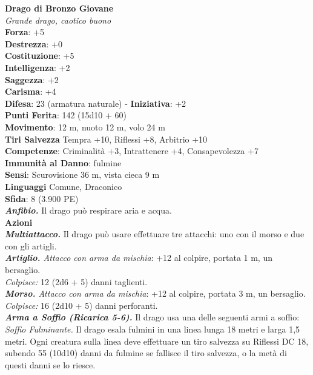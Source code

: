 \begin{multicols}{2}
\medskip\textbf{Drago di Bronzo Giovane}\\
\emph{Grande drago, caotico buono}\\
\textbf{Forza}: +5\\
\textbf{Destrezza}: +0\\
\textbf{Costituzione}: +5\\
\textbf{Intelligenza}: +2\\
\textbf{Saggezza}: +2\\
\textbf{Carisma}: +4\\
\textbf{Difesa}: 23 (armatura naturale) - \textbf{Iniziativa}: +2\\
\textbf{Punti Ferita}: 142 (15d10 + 60)\\
\textbf{Movimento}: 12 m, nuoto 12 m, volo 24 m\\
\textbf{Tiri Salvezza} Tempra +10, Riflessi +8, Arbitrio +10\\
\textbf{Competenze}: Criminalità +3, Intrattenere +4, Consapevolezza +7\\
\textbf{Immunità al Danno}: fulmine\\
\textbf{Sensi}: Scurovisione 36 m, vista cieca 9 m\\
\textbf{Linguaggi} Comune, Draconico\\
\textbf{Sfida}: 8 (3.900 PE)\smallskip\\
\emph{\textbf{Anfibio.}} Il drago può respirare aria e acqua.\\
\smallskip\textbf{Azioni}\\
\emph{\textbf{Multiattacco.}} Il drago può usare effettuare tre attacchi: uno con il morso e due con gli artigli.\\
\emph{\textbf{Artiglio.} Attacco con arma da mischia}: +12 al colpire, portata 1 m, un bersaglio.\\
\emph{Colpisce:} 12 (2d6 + 5) danni taglienti.\\
\emph{\textbf{Morso.} Attacco con arma da mischia}: +12 al colpire, portata 3 m, un bersaglio.\\
\emph{Colpisce:} 16 (2d10 + 5) danni perforanti.\\
\emph{\textbf{Arma a Soffio (Ricarica 5-6).}} Il drago usa una delle seguenti armi a soffio:\\
\emph{Soffio Fulminante.} Il drago esala fulmini in una linea lunga 18 metri e larga 1,5 metri. Ogni creatura sulla linea deve effettuare un tiro salvezza su Riflessi DC  18, subendo 55 (10d10) danni da fulmine se fallisce il tiro salvezza, o la metà di questi danni se lo riesce.\\

\end{multicols}
